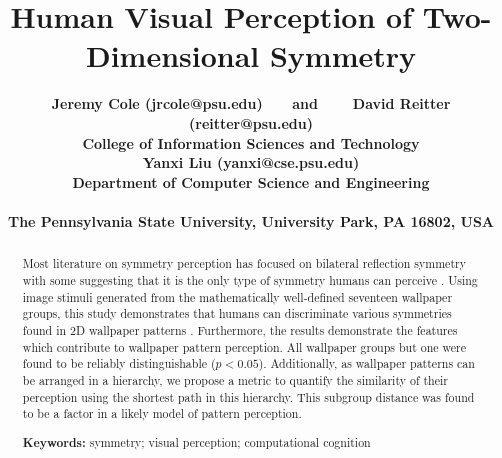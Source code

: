 \documentclass[10pt,letterpaper]{article}
\title{Human Visual Perception of Two-Dimensional Symmetry}
\author{\large \bf Jeremy Cole {(jrcole@psu.edu)}  ~~~\textnormal{and}
  ~~~ \large \bf David Reitter {(reitter@psu.edu)}  \\
College of Information Sciences and Technology \\
  \AND \large \bf Yanxi Liu {(yanxi@cse.psu.edu)} \\
  Department of Computer Science and Engineering \\
\\
The Pennsylvania State University, University Park, PA 16802, USA
}
\newcommand{\citep}[1]{\cite{#1}}
\begin{document}
\maketitle


\begin{abstract}
Most literature on symmetry perception has focused on bilateral reflection symmetry with some suggesting that it is the only type of symmetry humans can perceive \citep{bio}. Using image stimuli generated from the mathematically well-defined seventeen wallpaper groups, this study demonstrates that humans can discriminate various symmetries found in 2D wallpaper patterns \citep{yanxitrends}. Furthermore, the results demonstrate the features which contribute to wallpaper pattern perception. All wallpaper groups but one were found to be reliably distinguishable ($p<0.05$). Additionally, as wallpaper patterns can be arranged in a hierarchy, we propose a metric to quantify the similarity of their perception using the shortest path in this hierarchy. This subgroup distance was found to be a factor in a likely model of pattern perception. 

\textbf{Keywords:} 
symmetry; visual perception; computational cognition
\end{abstract}



%








{
\renewcommand{\bibliographytypesize}{\small}
\setlength{\bibleftmargin}{.125in}
\setlength{\bibindent}{-\bibleftmargin}

}
\end{document}
